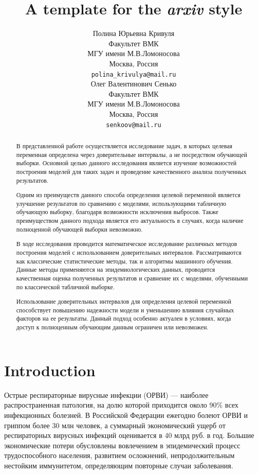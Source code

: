 \documentclass{article}
\title{A template for the \emph{arxiv} style}
\author{  Полина Юрьевна Кривуля \\
	Факультет ВМК \\
    МГУ имени М.В.Ломоносова \\
	Москва, Россия \\
	\texttt{polina\_krivulya@mail.ru} \\
	\And
	Олег Валентинович Сенько \\
	Факультет ВМК \\
    МГУ имени М.В.Ломоносова \\
	Москва, Россия \\
	\texttt{senkoov@mail.ru}  \\
}
\date{}
\begin{document}
\maketitle

\begin{abstract}
	В представленной работе осуществляется исследование задач, в которых целевая переменная определена через доверительные интервалы, а не посредством обучающей выборки. Основной целью данного исследования является изучение возможностей построения моделей для таких задач и проведение качественного анализа полученных результатов.

Одним из преимуществ данного способа определения целевой переменной является улучшение результатов по сравнению с моделями, использующими табличную обучающую выборку, благодаря возможности исключения выбросов. Также преимуществом данного подхода является его актуальность в случаях, когда наличие полноценной обучающей выборки невозможно.

В ходе исследования проводится математическое исследование различных методов построения моделей с использованием доверительных интервалов. Рассматриваются как классические статистические методы, так и алгоритмы машинного обучения. Данные методы применяются на эпидемиологических данных, проводится качественная оценка полученных результатов и сравнение их с моделями, обученными по классической табличной выборке.

Использование доверительных интервалов для определения целевой переменной способствует повышению надежности модели и уменьшению влияния случайных факторов на ее результаты. Данный подход особенно актуален в условиях, когда доступ к полноценным обучающим данным ограничен или невозможен.

\end{abstract}



\section{Introduction}
Острые респираторные вирусные инфекции (ОРВИ) — наиболее распространенная патология, на долю которой приходится около 90\% всех инфекционных болезней. В Российской Федерации ежегодно болеют ОРВИ и гриппом более 30 млн человек, а суммарный экономический ущерб от респираторных вирусных инфекций оценивается в 40 млрд руб. в год. Большие экономические потери обусловлены вовлечением в эпидемический процесс трудоспособного населения, развитием осложнений, непродолжительным нестойким иммунитетом, определяющим повторные случаи заболевания. 
\end{document}
